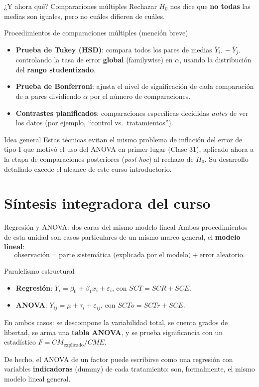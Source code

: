 \documentclass[aspectratio=169,11pt]{beamer}
\begin{document}
\begin{frame}{¿Y ahora qué? Comparaciones múltiples}
Rechazar $H_0$ nos dice que \textbf{no todas} las medias son iguales, pero no cuáles difieren de cuáles.

\begin{block}{Procedimientos de comparaciones múltiples (mención breve)}
\begin{itemize}
\item \textbf{Prueba de Tukey (HSD)}: compara todos los pares de medias $\bar Y_{i\cdot}-\bar Y_{j\cdot}$ controlando la tasa de error \textbf{global} (familywise) en $\alpha$, usando la distribución del \textbf{rango studentizado}.
\item \textbf{Prueba de Bonferroni}: ajusta el nivel de significación de cada comparación de a pares dividiendo $\alpha$ por el número de comparaciones.
\item \textbf{Contrastes planificados}: comparaciones específicas decididas \emph{antes} de ver los datos (por ejemplo, ``control vs.\ tratamientos'').
\end{itemize}
\end{block}

\begin{alertblock}{Idea general}
Estas técnicas evitan el mismo problema de inflación del error de tipo I que motivó el uso del ANOVA en primer lugar (Clase 31), aplicado ahora a la etapa de comparaciones posteriores (\emph{post-hoc}) al rechazo de $H_0$. Su desarrollo detallado excede el alcance de este curso introductorio.
\end{alertblock}
\end{frame}

\section{Síntesis integradora del curso}

\begin{frame}{Regresión y ANOVA: dos caras del mismo modelo lineal}
Ambos procedimientos de esta unidad son casos particulares de un mismo marco general, el \textbf{modelo lineal}:
\[
\text{observación} = \text{parte sistemática (explicada por el modelo)} + \text{error aleatorio}.
\]

\begin{block}{Paralelismo estructural}
\begin{itemize}
\item \textbf{Regresión}: $Y_i=\beta_0+\beta_1 x_i+\varepsilon_i$, con $SCT=SCR+SCE$.
\item \textbf{ANOVA}: $Y_{ij}=\mu+\tau_i+\varepsilon_{ij}$, con $SCTo=SCTr+SCE$.
\end{itemize}
En ambos casos: se descompone la variabilidad total, se cuenta grados de libertad, se arma una \textbf{tabla ANOVA}, y se prueba significancia con un estadístico $F=CM_{\text{explicado}}/CME$.
\end{block}

De hecho, el ANOVA de un factor puede escribirse como una regresión con variables \textbf{indicadoras} (dummy) de cada tratamiento: son, formalmente, el mismo modelo lineal general.
\end{frame}
\end{document}
